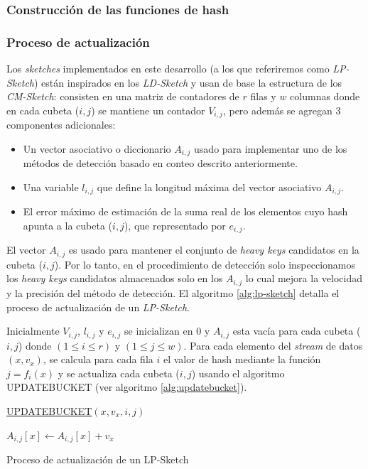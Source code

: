 \documentclass[a4paper,10pt, oneside]{article}
\begin{document}
\subsubsection{Construcción de las funciones de hash}

\subsubsection{Proceso de actualización}

Los \textit{sketches} implementados en este desarrollo (a los que referiremos como \textit{LP-Sketch}) están inspirados en los \textit{LD-Sketch} y usan de base la estructura de los \textit{CM-Sketch}: consisten en una matriz de contadores de $r$ filas y $w$ columnas donde en cada cubeta ($i,j$) se mantiene un contador $V_{i, j}$, pero además se agregan 3 componentes adicionales:
\begin{itemize}
	\item Un vector asociativo o diccionario $A_{i,j}$ usado para implementar uno de los métodos de detección basado en conteo descrito anteriormente.
	\item Una variable $l_{i,j}$ que define la longitud máxima del vector asociativo $A_{i,j}$.
	\item El error máximo de estimación de la suma real de los elementos cuyo hash apunta a la cubeta ($i,j$), que representado por $e_{i,j}$.
\end{itemize}

El vector $A_{i,j}$ es usado para mantener el conjunto de \textit{heavy keys} candidatos en la cubeta ($i,j$). Por lo tanto, en el procedimiento de detección solo inspeccionamos los \textit{heavy keys} candidatos almacenados solo en los $A_{i,j}$ lo cual mejora la velocidad y la precisión del método de detección. El algoritmo \ref{alg:lp-sketch} detalla el proceso de actualización de un \textit{LP-Sketch}.

Inicialmente $V_{i,j}$, $l_{i,j}$ y $e_{i,j}$ se inicializan en $0$ y $A_{i,j}$ esta vacía para cada cubeta ($i,j$) donde $(1\leq i \leq r)$ y $(1\leq j \leq w)$. Para cada elemento del \textit{stream} de datos $(x, v_x)$, se calcula para cada fila $i$ el valor de hash mediante la función $j = f_i(x)$ y se actualiza cada cubeta ($i,j$) usando el algoritmo UPDATEBUCKET (ver algoritmo \ref{alg:updatebucket}).

\begin{algorithm}[ht]
	
	\underline{UPDATEBUCKET}$(x, v_x, i, j)$\;

	{
		$A_{i,j}[x] \leftarrow A_{i,j}[x] + v_x$\;
	}{
	}
	
	\caption{Proceso de actualización de un LP-Sketch}
\label{alg:updatebucket}
\end{algorithm}	
\end{document}
